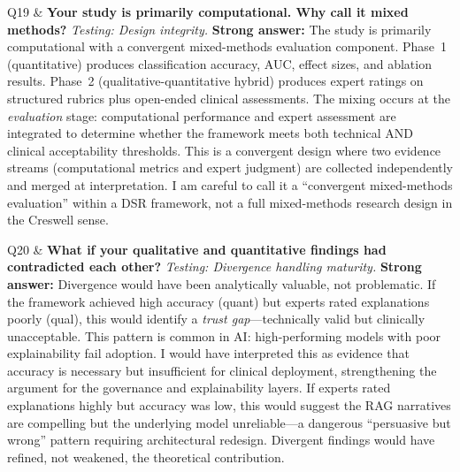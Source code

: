 \begin{xltabular}
Q19 & \textbf{Your study is primarily computational. Why call it mixed methods?} \newline
\textit{Testing: Design integrity.} \newline\newline
\textbf{Strong answer:} The study is primarily computational with a convergent mixed-methods evaluation component. Phase~1 (quantitative) produces classification accuracy, AUC, effect sizes, and ablation results. Phase~2 (qualitative-quantitative hybrid) produces expert ratings on structured rubrics plus open-ended clinical assessments. The mixing occurs at the \textit{evaluation} stage: computational performance and expert assessment are integrated to determine whether the framework meets both technical AND clinical acceptability thresholds. This is a convergent design where two evidence streams (computational metrics and expert judgment) are collected independently and merged at interpretation. I am careful to call it a ``convergent mixed-methods evaluation'' within a DSR framework, not a full mixed-methods research design in the Creswell sense. \\
\addlinespace

Q20 & \textbf{What if your qualitative and quantitative findings had contradicted each other?} \newline
\textit{Testing: Divergence handling maturity.} \newline\newline
\textbf{Strong answer:} Divergence would have been analytically valuable, not problematic. If the framework achieved high accuracy (quant) but experts rated explanations poorly (qual), this would identify a \textit{trust gap}---technically valid but clinically unacceptable. This pattern is common in AI: high-performing models with poor explainability fail adoption. I would have interpreted this as evidence that accuracy is necessary but insufficient for clinical deployment, strengthening the argument for the governance and explainability layers. If experts rated explanations highly but accuracy was low, this would suggest the RAG narratives are compelling but the underlying model unreliable---a dangerous ``persuasive but wrong'' pattern requiring architectural redesign. Divergent findings would have refined, not weakened, the theoretical contribution. \\

\end{xltabular}

